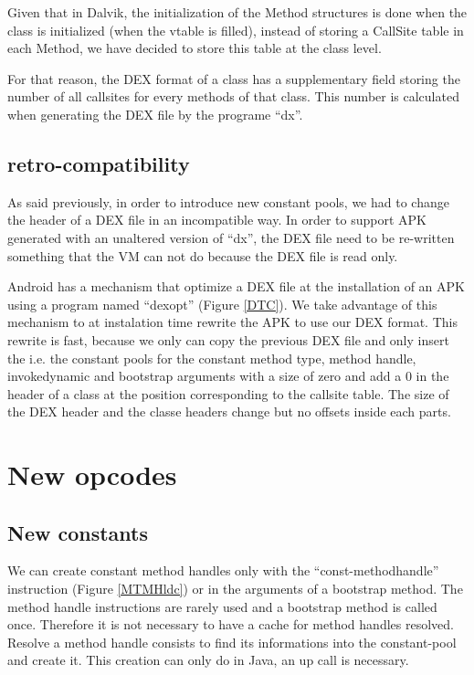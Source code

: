 \documentclass{sig-alternate}
\def \DALVIK{Dalvik\xspace}
\def \ANDROID{Android\xspace}
\begin{document}
    Given that in \DALVIK, the initialization of the Method structures is done when
    the class is initialized (when the vtable is filled), instead of storing a CallSite
    table in each Method, we have decided to store this table at the class level.
    
    For that reason, the DEX format of a class has a supplementary field storing
    the number of all callsites for every methods of that class. 
    This number is calculated when generating the DEX file by the programe ``dx''.

  \subsection{retro-compatibility}
    \label{retro}

    As said previously, in order to introduce new constant pools, we had to change
    the header of a DEX file in an incompatible way.
    In order to support APK generated with an unaltered version of ``dx'',
    the DEX file need to be re-written something that the VM can not do
    because the DEX file is read only.

    \ANDROID has a mechanism that optimize a DEX file at the installation of
    an APK using a program named ``dexopt'' (Figure \ref{DTC}).
    We take advantage of this mechanism to at instalation time rewrite the APK to use our DEX format.
    This rewrite is fast, because we only can copy the previous DEX file and only insert the
    i.e. the constant pools for the constant method type, method handle, invokedynamic and
    bootstrap arguments with a size of zero and add a 0 in the header of a class at the
    position corresponding to the callsite table.
    The size of the DEX header and the classe headers change but no offsets inside each parts.

\section{New opcodes}
\label{newConst}
  \subsection{New constants}

    We can create constant method handles only with the ``const-methodhandle'' instruction (Figure \ref{MTMHldc}) or in the arguments of a bootstrap method.
    The method handle instructions are rarely used and a bootstrap method is called once.
    Therefore it is not necessary to have a cache for method handles resolved.
    Resolve a method handle consists to find its informations into the constant-pool and create it.
    This creation can only do in Java, an up call is necessary.
\end{document}
